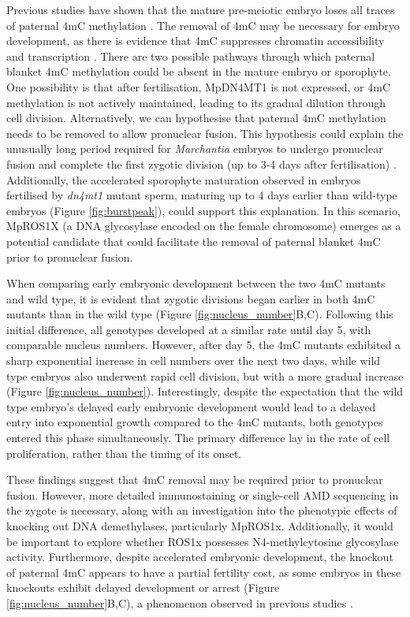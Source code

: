  Previous studies have shown that the mature pre-meiotic embryo loses all traces of paternal 4mC methylation \cite{RN189}. The removal of 4mC may be necessary for embryo development, as there is evidence that 4mC suppresses chromatin accessibility and transcription \cite{RN189}. There are two possible pathways through which paternal blanket 4mC methylation could be absent in the mature embryo or sporophyte.  One possibility is that after fertilisation, MpDN4MT1 is not expressed, or 4mC methylation is not actively maintained, leading to its gradual dilution through cell division. Alternatively, we can hypothesise that paternal 4mC methylation needs to be removed to allow pronuclear fusion. This hypothesis could explain the unusually long period required for \textit{Marchantia} embryos to undergo pronuclear fusion and complete the first zygotic division (up to 3-4 days after fertilisation) \cite{RN139}. Additionally, the accelerated sporophyte maturation observed in embryos fertilised by \textit{dn4mt1} mutant sperm, maturing up to 4 days earlier than wild-type embryos (Figure \ref{fig:burstpeak}), could support this explanation. In this scenario, MpROS1X (a DNA glycosylase encoded on the female chromosome) emerges as a potential candidate that could facilitate the removal of paternal blanket 4mC prior to pronuclear fusion.

When comparing early embryonic development between the two 4mC mutants and wild type, it is evident that zygotic divisions began earlier in both 4mC mutants than in the wild type (Figure \ref{fig:nucleus_number}B,C). Following this initial difference, all genotypes developed at a similar rate until day 5, with comparable nucleus numbers. However, after day 5, the 4mC mutants exhibited a sharp exponential increase in cell numbers over the next two days, while wild type embryos also underwent rapid cell division, but with a more gradual increase (Figure \ref{fig:nucleus_number}). Interestingly, despite the expectation that the wild type embryo's delayed early embryonic development would lead to a delayed entry into exponential growth compared to the 4mC mutants, both genotypes entered this phase simultaneously. The primary difference lay in the rate of cell proliferation, rather than the timing of its onset.

These findings suggest that 4mC removal may be required prior to pronuclear fusion. However, more detailed immunostaining or single-cell AMD sequencing in the zygote is necessary, along with an investigation into the phenotypic effects of knocking out DNA demethylases, particularly MpROS1x. Additionally, it would be important to explore whether ROS1x possesses N4-methylcytosine glycosylase activity. Furthermore, despite accelerated embryonic development, the knockout of paternal 4mC appears to have a partial fertility cost, as some embryos in these knockouts exhibit delayed development or arrest (Figure \ref{fig:nucleus_number}B,C), a phenomenon observed in previous studies \cite{RN189}.

